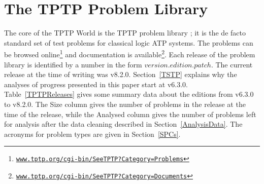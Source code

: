 \documentclass[runningheads]{llncs}
\begin{document}
\section{The TPTP Problem Library}
\label{TPTP}

The core of the TPTP World is the TPTP problem library \cite{Sut09}; it is the de facto standard 
set of test problems for classical logic ATP systems.
The problems can be browsed online\footnote{%
\href{https://www.tptp.org/cgi-bin/SeeTPTP?Category=Problems}
{\tt www.tptp.org/cgi-bin/SeeTPTP?Category=Problems}}
and documentation is available\footnote{%
\href{https://www.tptp.org/cgi-bin/SeeTPTP?Category=Documents}
{\tt www.tptp.org/cgi-bin/SeeTPTP?Category=Documents}}.
Each release of the problem library is identified by a number in the form 
$version$.$edition$.$patch$.
The current release at the time of writing was v8.2.0.
Section~\ref{TSTP} explains why the analyses of progress presented in this paper start at v6.3.0.
Table~\ref{TPTPReleases} gives some summary data about the editions from v6.3.0 to v8.2.0.
The Size column gives the number of problems in the release at the time of the release, while
the Analysed column gives the number of problems left for analysis after the data cleaning 
described in Section~\ref{AnalysisData}.
The acronyms for problem types are given in Section~\ref{SPCs}.
\end{document}
